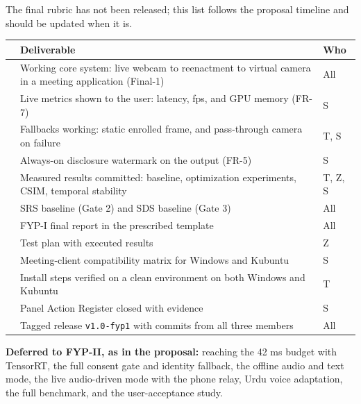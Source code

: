 \documentclass[10pt,a4paper]{article}
\newcounter{cbn}
\newcommand{\cb}{\mbox{\stepcounter{cbn}\CheckBox[name=cb\thecbn,width=9pt,height=9pt,borderwidth=0.8pt,bordercolor=0 0 0,backgroundcolor=1 1 1,checkboxsymbol=\ding{51}]{}}}
\begin{document}
\begin{Form}
The final rubric has not been released; this list follows the proposal timeline and should be updated when it is.

\begin{longtable}{@{}p{6mm}p{124mm}p{38mm}@{}}
\toprule
 & Deliverable & Who \\
\midrule
\endhead
\cb & Working core system: live webcam to reenactment to virtual camera in a meeting application (Final-1) & All \\
\cb & Live metrics shown to the user: latency, fps, and GPU memory (FR-7) & S \\
\cb & Fallbacks working: static enrolled frame, and pass-through camera on failure & T, S \\
\cb & Always-on disclosure watermark on the output (FR-5) & S \\
\cb & Measured results committed: baseline, optimization experiments, CSIM, temporal stability & T, Z, S \\
\cb & SRS baseline (Gate 2) and SDS baseline (Gate 3) & All \\
\cb & FYP-I final report in the prescribed template & All \\
\cb & Test plan with executed results & Z \\
\cb & Meeting-client compatibility matrix for Windows and Kubuntu & S \\
\cb & Install steps verified on a clean environment on both Windows and Kubuntu & T \\
\cb & Panel Action Register closed with evidence & S \\
\cb & Tagged release \texttt{v1.0-fyp1} with commits from all three members & All \\
\bottomrule
\end{longtable}

\textbf{Deferred to FYP-II, as in the proposal:} reaching the 42 ms budget with TensorRT, the full consent gate and identity fallback, the offline audio and text mode, the live audio-driven mode with the phone relay, Urdu voice adaptation, the full benchmark, and the user-acceptance study.

\end{Form}
\end{document}
